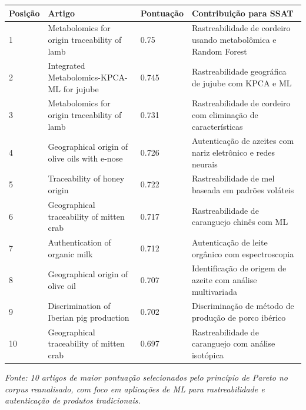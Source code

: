 \begin{table}[h]
\centering
\small
\begin{tabular}{|l|l|l|l|}
\hline
\textbf{Posição} & \textbf{Artigo} & \textbf{Pontuação} & \textbf{Contribuição para SSAT} \\ \hline
1 & Metabolomics for origin traceability of lamb & 0.75 & Rastreabilidade de cordeiro usando metabolômica e Random Forest \\ \hline
2 & Integrated Metabolomics-KPCA-ML for jujube & 0.745 & Rastreabilidade geográfica de jujube com KPCA e ML \\ \hline
3 & Metabolomics for origin traceability of lamb & 0.731 & Rastreabilidade de cordeiro com eliminação de características \\ \hline
4 & Geographical origin of olive oils with e-nose & 0.726 & Autenticação de azeites com nariz eletrônico e redes neurais \\ \hline
5 & Traceability of honey origin & 0.722 & Rastreabilidade de mel baseada em padrões voláteis \\ \hline
6 & Geographical traceability of mitten crab & 0.717 & Rastreabilidade de caranguejo chinês com ML \\ \hline
7 & Authentication of organic milk & 0.712 & Autenticação de leite orgânico com espectroscopia \\ \hline
8 & Geographical origin of olive oil & 0.707 & Identificação de origem de azeite com análise multivariada \\ \hline
9 & Discrimination of Iberian pig production & 0.702 & Discriminação de método de produção de porco ibérico \\ \hline
10 & Geographical traceability of mitten crab & 0.697 & Rastreabilidade de caranguejo com análise isotópica \\ \hline
\end{tabular}
\end{table}

\emph{Fonte: 10 artigos de maior pontuação selecionados pelo princípio de Pareto no corpus reanalisado, com foco em aplicações de ML para rastreabilidade e autenticação de produtos tradicionais.}

